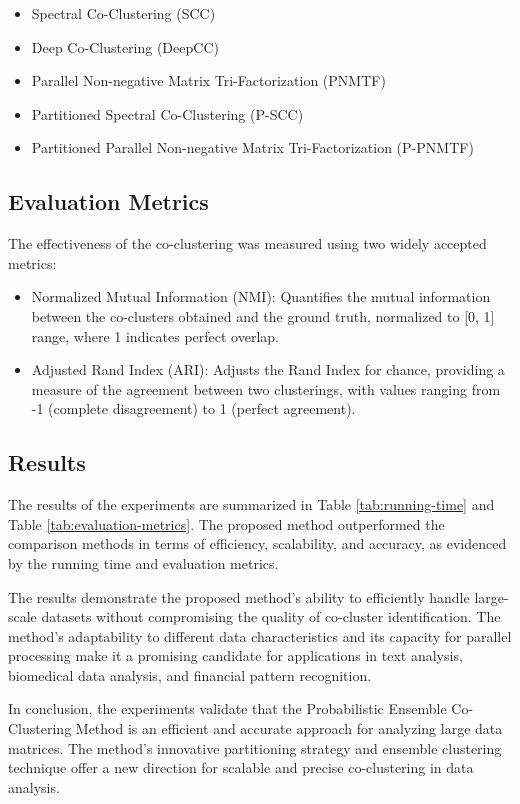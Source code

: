 \begin{itemize}
    \item Spectral Co-Clustering (SCC)
    \item Deep Co-Clustering (DeepCC)
    \item Parallel Non-negative Matrix Tri-Factorization (PNMTF)
    \item Partitioned Spectral Co-Clustering (P-SCC)
    \item Partitioned Parallel Non-negative Matrix Tri-Factorization (P-PNMTF)
\end{itemize}

\subsection{Evaluation Metrics}
The effectiveness of the co-clustering was measured using two widely accepted metrics:

\begin{itemize}
    \item Normalized Mutual Information (NMI): Quantifies the mutual information between the co-clusters obtained and the ground truth, normalized to [0, 1] range, where 1 indicates perfect overlap.
    \item Adjusted Rand Index (ARI): Adjusts the Rand Index for chance, providing a measure of the agreement between two clusterings, with values ranging from -1 (complete disagreement) to 1 (perfect agreement).
\end{itemize}

\subsection{Results}
The results of the experiments are summarized in Table \ref{tab:running-time} and Table \ref{tab:evaluation-metrics}. The proposed method outperformed the comparison methods in terms of efficiency, scalability, and accuracy, as evidenced by the running time and evaluation metrics.

The results demonstrate the proposed method's ability to efficiently handle large-scale datasets without compromising the quality of co-cluster identification. The method's adaptability to different data characteristics and its capacity for parallel processing make it a promising candidate for applications in text analysis, biomedical data analysis, and financial pattern recognition.

In conclusion, the experiments validate that the Probabilistic Ensemble Co-Clustering Method is an efficient and accurate approach for analyzing large data matrices. The method's innovative partitioning strategy and ensemble clustering technique offer a new direction for scalable and precise co-clustering in data analysis.
